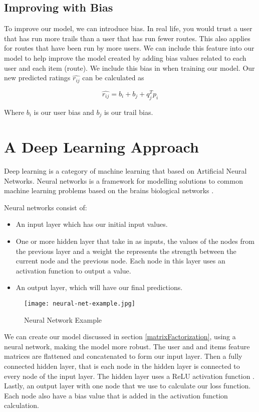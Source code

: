 \subsection{Improving with Bias}
To improve our model, we can introduce bias. In real life, you would trust a user that has run more trails than a user that has run fewer routes. This also applies for routes that have been run by more users. We can include this feature into our model to help improve the model created by adding bias values related to each user and each item (route). We include this bias in when training our model. Our new predicted ratings $\hat{r_{ij}}$ can be calculated as

\begin{equation}
    \hat{r_{ij}} = b_i + b_j + {q^{T}_{j}}{p_i}
\end{equation}

Where $b_i$ is our user bias and $b_j$ is our trail bias.

\section{A Deep Learning Approach} \label{neuralNetwork}
Deep learning is a category of machine learning that based on Artificial Neural Networks. Neural networks is a framework for modelling solutions to common machine learning problems based on the brains biological networks \cite{van2018artificial}. 

Neural networks consist of:
\begin{itemize}
    \item An input layer which has our initial input values.
    \item One or more hidden layer that take in as inputs, the values of the nodes from the previous layer and a weight the represents the strength between the current node and the previous node. Each node in this layer uses an activation function to output a value.
    \item An output layer, which will have our final predictions.
\end{itemize}

\begin{figure}[ht]
    \centering
    \texttt{[image: neural-net-example.jpg]}
    \caption{Neural Network Example \cite{neuralNet}}
    \label{fig:neuralNetworkExample}
\end{figure}


We can create our model discussed in section \ref{matrixFactorization}, using a neural network, making the model more robust. The user and and items feature matrices are flattened and concatenated to form our input layer. Then a fully connected hidden layer, that is each node in the hidden layer is connected to every node of the input layer. The hidden layer uses a ReLU activation function \cite{li2017convergence}. Lastly, an output layer with one node that we use to calculate our loss function. Each node also have a bias value that is added in the activation function calculation.

